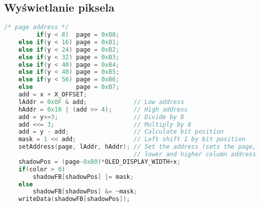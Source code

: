 \documentclass[letterpaper,11pt]{report}
\begin{document}
\subsection{Wyświetlanie piksela}
\begin{lstlisting}[language=C]
    /* page address */
         if(y < 8)  page = 0xB0;
    else if(y < 16) page = 0xB1;
    else if(y < 24) page = 0xB2;
    else if(y < 32) page = 0xB3;
    else if(y < 40) page = 0xB4;
    else if(y < 48) page = 0xB5;
    else if(y < 56) page = 0xB6;
    else            page = 0xB7;
    add = x + X_OFFSET;
    lAddr = 0x0F & add;             // Low address
    hAddr = 0x10 | (add >> 4);      // High address
    add = y>>3;                     // Divide by 8
    add <<= 3;                      // Multiply by 8
    add = y - add;                  // Calculate bit position
    mask = 1 << add;                // Left shift 1 by bit position
    setAddress(page, lAddr, hAddr); // Set the address (sets the page,
                                    // lower and higher column address pointers)
    shadowPos = (page-0xB0)*OLED_DISPLAY_WIDTH+x;
    if(color > 0)
        shadowFB[shadowPos] |= mask;
    else
        shadowFB[shadowPos] &= ~mask;
    writeData(shadowFB[shadowPos]);
\end{lstlisting}
\end{document}
